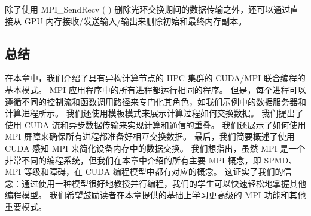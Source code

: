 除了使用 MPI\_SendRecv ( ) 删除光环交换期间的数据传输之外，还可以通过直接从 GPU 内存接收/发送输入/输出来删除初始和最终内存副本。

\subsection{总结}
在本章中，我们介绍了具有异构计算节点的 HPC 集群的 CUDA/MPI 联合编程的基本模式。 MPI 应用程序中的所有进程都运行相同的程序。 但是，每个进程可以遵循不同的控制流和函数调用路径来专门化其角色，如我们示例中的数据服务器和计算进程所示。 我们还使用模板模式来展示计算过程如何交换数据。 我们提出了使用 CUDA 流和异步数据传输来实现计算和通信的重叠。 我们还展示了如何使用 MPI 屏障来确保所有进程都准备好相互交换数据。 最后，我们简要概述了使用 CUDA 感知 MPI 来简化设备内存中的数据交换。 我们想指出，虽然 MPI 是一个非常不同的编程系统，但我们在本章中介绍的所有主要 MPI 概念，即 SPMD、MPI 等级和障碍，在 CUDA 编程模型中都有对应的概念。 这证实了我们的信念：通过使用一种模型很好地教授并行编程，我们的学生可以快速轻松地掌握其他编程模型。 我们希望鼓励读者在本章提供的基础上学习更高级的 MPI 功能和其他重要模式。